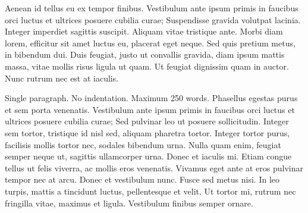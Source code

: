 \documentclass[
    colorlinks=true,        %
    linkcolor=black,          %
    anchorcolor=black,      %
    citecolor=black,         %
    urlcolor=black,          %
    bookmarks=true,         %
    bookmarksopen=false,    %
    bookmarksnumbered=true,  %
    dvipsnames
]{MAE}
\begin{document}
Aenean id tellus eu ex tempor finibus. Vestibulum ante ipsum primis in faucibus orci luctus et ultrices posuere cubilia curae; Suspendisse gravida volutpat lacinia. Integer imperdiet sagittis suscipit. Aliquam vitae tristique ante. Morbi diam lorem, efficitur sit amet luctus eu, placerat eget neque. Sed quis pretium metus, in bibendum dui. Duis feugiat, justo ut convallis gravida, diam ipsum mattis massa, vitae mollis risus ligula ut quam. Ut feugiat dignissim quam in auctor. Nunc rutrum nec est at iaculis.

\cleardoublepage


\maketitle

\vspace{0.5\baselineskip}

\relax
{}\relax



\noindent Single paragraph. No indentation. Maximum 250 words. Phasellus egestas purus et sem porta venenatis. Vestibulum ante ipsum primis in faucibus orci luctus et ultrices posuere cubilia curae; Sed pulvinar leo ut posuere sollicitudin. Integer sem tortor, tristique id nisl sed, aliquam pharetra tortor. Integer tortor purus, facilisis mollis tortor nec, sodales bibendum urna. Nulla quam enim, feugiat semper neque ut, sagittis ullamcorper urna. Donec et iaculis mi. Etiam congue tellus ut felis viverra, ac mollis eros venenatis. Vivamus eget ante at eros pulvinar tempor nec at arcu. Donec et vestibulum nunc. Fusce sed metus nisi. In leo turpis, mattis a tincidunt luctus, pellentesque et velit. Ut tortor mi, rutrum nec fringilla vitae, maximus et ligula. Vestibulum finibus semper ornare.

\end{document}
